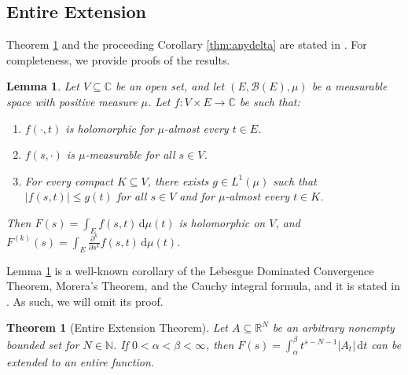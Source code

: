 \documentclass{article}
\theoremstyle{plain}
\newtheorem{theorem}{Theorem}
\newtheorem{lemma}{Lemma}
\numberwithin{equation}{section}
\numberwithin{table}{section}
\numberwithin{figure}{section}
\newcommand{\vaddspace}[1]{\rule{0pt}{#1pt}}
\newcommand{\newparagraph}{\vaddspace{10}}
\begin{document}
\subsection{Entire Extension} \label{chap:entireextensiontheorem}
Theorem \ref{thm:entireextension} and the proceeding Corollary \ref{thm:anydelta} are stated in \cite[Proposition 2.2.13]{lapidusbook}. For completeness, we provide proofs of the results.

\begin{lemma} \label{thm:entireextensionlemma}
Let $V \subseteq \mathbb{C}$ be an open set, and let $(E, \mathscr{B}(E), \mu)$ be a measurable space with positive measure $\mu$. Let $f : V \times E \rightarrow \mathbb{C}$ be such that:
\begin{enumerate}
    \item $f(\cdot,t)$ is holomorphic for $\mu$-almost every $t \in E$.
    \item $f(s,\cdot)$ is $\mu$-measurable for all $s \in V$.
    \item For every compact $K \subseteq V$, there exists $g \in L^1(\mu)$ such that $|f(s,t)| \leq g(t)$ for all $s \in V$ and for $\mu$-almost every $t \in K$.
\end{enumerate}
Then $\displaystyle F(s) = \int_E f(s,t) \,\mathrm{d}\mu(t)$ is holomorphic on $V$, and $\displaystyle F^{(k)}(s) = \int_E \frac{\partial^k}{\partial s^k} f(s,t) \,\mathrm{d}\mu(t)$.
\end{lemma}

Lemma \ref{thm:entireextensionlemma} is a well-known corollary of the Lebesgue Dominated Convergence Theorem, Morera's Theorem, and the Cauchy integral formula, and it is stated in \cite[Theorem 2.1.47]{lapidusbook}. As such, we will omit its proof.
\newparagraph



\begin{theorem}[Entire Extension Theorem] \label{thm:entireextension}
Let $A \subseteq \mathbb{R}^N$ be an arbitrary nonempty bounded set for $N \in \mathbb{N}$. If $0 < \alpha < \beta < \infty$, then $\displaystyle F(s) = \int_{\alpha}^{\beta} t^{s-N-1} |A_t| \,\mathrm{d}t$ can be extended to an entire function.
\end{theorem}
\end{document}

